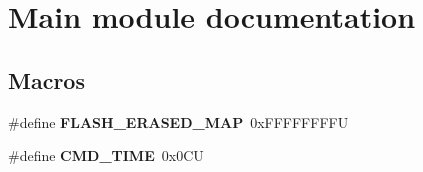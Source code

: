 \hypertarget{group___main__module}{}\section{Main module documentation}
\label{group___main__module}
\subsection*{Macros}
\begin{DoxyCompactItemize}
\item 
\hypertarget{group___main__module_ga880ce8152aa57ad0203fe748f1b6ab8c}{}\#define {\bfseries F\+L\+A\+S\+H\+\_\+\+E\+R\+A\+S\+E\+D\+\_\+\+M\+A\+P}~0x\+F\+F\+F\+F\+F\+F\+F\+F\+U\label{group___main__module_ga880ce8152aa57ad0203fe748f1b6ab8c}

\item 
\hypertarget{group___main__module_ga5ece71caf900a0268afbb1e7f222cb05}{}\#define {\bfseries C\+M\+D\+\_\+\+T\+I\+M\+E}~0x0\+C\+U\label{group___main__module_ga5ece71caf900a0268afbb1e7f222cb05}

\end{DoxyCompactItemize}
